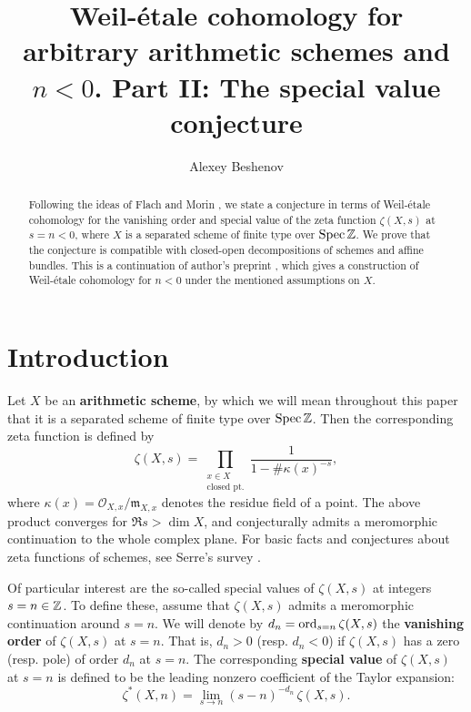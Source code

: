 \documentclass{article}
\title{Weil-étale cohomology for arbitrary arithmetic schemes and $n < 0$.
  Part II: The special value conjecture}
\author{Alexey Beshenov}
\numberwithin{equation}{section}
\begin{document}
\maketitle

\begin{abstract}
  Following the ideas of Flach and Morin \cite{Flach-Morin-2018}, we state a
  conjecture in terms of Weil-étale cohomology for the vanishing order and
  special value of the zeta function $\zeta (X,s)$ at $s = n < 0$, where $X$ is
  a separated scheme of finite type over $\operatorname{Spec} \mathbb{Z}$. We prove that the
  conjecture is compatible with closed-open decompositions of schemes and affine
  bundles. This is a continuation of author's preprint
  \cite{Beshenov-Weil-etale-1}, which gives a construction of Weil-étale
  cohomology for $n<0$ under the mentioned assumptions on $X$.
\end{abstract}

\tableofcontents


\section{Introduction}

Let $X$ be an \textbf{arithmetic scheme}, by which we will mean throughout this
paper that it is a separated scheme of finite type over $\operatorname{Spec} \mathbb{Z}$. Then the
corresponding zeta function is defined by
\[ \zeta (X,s) = \prod_{\substack{x \in X \\ \text{closed pt.}}}
  \frac{1}{1 - \#\kappa (x)^{-s}}, \]
where $\kappa (x) = \mathcal{O}_{X,x}/\mathfrak{m}_{X,x}$ denotes the residue
field of a point. The above product converges for $\Re s > \dim X$, and
conjecturally admits a meromorphic continuation to the whole complex plane.
For basic facts and conjectures about zeta functions of schemes, see Serre's
survey \cite{Serre-1965}.

Of particular interest are the so-called special values of $\zeta (X,s)$ at
integers $s = n \in \mathbb{Z}$. To define these, assume that $\zeta (X,s)$ admits a
meromorphic continuation around $s = n$. We will denote by
$d_n = \operatorname{ord}_{s=n} \zeta (X,s)$ the \textbf{vanishing order} of $\zeta (X,s)$ at
$s = n$. That is, $d_n > 0$ (resp. $d_n < 0$) if $\zeta (X,s)$ has a zero
(resp. pole) of order $d_n$ at $s = n$. The corresponding \textbf{special value}
of $\zeta (X,s)$ at $s = n$ is defined to be the leading nonzero coefficient of
the Taylor expansion:
$$\zeta^* (X,n) = \lim_{s \to n} (s - n)^{-d_n}\,\zeta (X,s).$$
\end{document}
